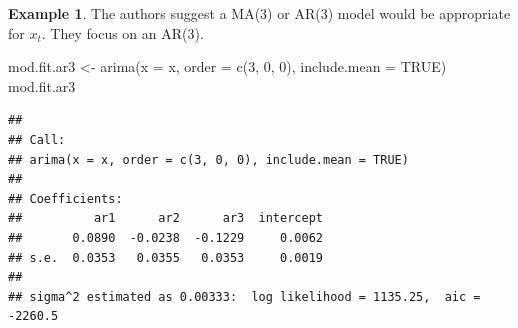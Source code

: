 \documentclass[
]{book}
\newenvironment{Shaded}{\begin{snugshade}}{\end{snugshade}}
\newcommand{\AttributeTok}[1]{\textcolor[rgb]{0.77,0.63,0.00}{#1}}
\newcommand{\ConstantTok}[1]{\textcolor[rgb]{0.00,0.00,0.00}{#1}}
\newcommand{\DecValTok}[1]{\textcolor[rgb]{0.00,0.00,0.81}{#1}}
\newcommand{\FunctionTok}[1]{\textcolor[rgb]{0.00,0.00,0.00}{#1}}
\newcommand{\NormalTok}[1]{#1}
\newcommand{\OtherTok}[1]{\textcolor[rgb]{0.56,0.35,0.01}{#1}}
\newcommand{\SpecialCharTok}[1]{\textcolor[rgb]{0.00,0.00,0.00}{#1}}
\theoremstyle{definition}
\theoremstyle{definition}
\newtheorem{example}{Example}[chapter]
\theoremstyle{definition}
\theoremstyle{definition}
\theoremstyle{remark}
\begin{document}
\begin{example}
The authors suggest a MA(3) or AR(3) model would be appropriate for \(x_t\). They focus on an AR(3).

\begin{Shaded}
\begin{Highlighting}[]
\NormalTok{mod.fit.ar3 }\OtherTok{\textless{}{-}} \FunctionTok{arima}\NormalTok{(}\AttributeTok{x =}\NormalTok{ x, }\AttributeTok{order =} \FunctionTok{c}\NormalTok{(}\DecValTok{3}\NormalTok{, }\DecValTok{0}\NormalTok{, }\DecValTok{0}\NormalTok{), }
                       \AttributeTok{include.mean =} \ConstantTok{TRUE}\NormalTok{)}
\NormalTok{mod.fit.ar3}
\end{Highlighting}
\end{Shaded}

\begin{verbatim}
## 
## Call:
## arima(x = x, order = c(3, 0, 0), include.mean = TRUE)
## 
## Coefficients:
##          ar1      ar2      ar3  intercept
##       0.0890  -0.0238  -0.1229     0.0062
## s.e.  0.0353   0.0355   0.0353     0.0019
## 
## sigma^2 estimated as 0.00333:  log likelihood = 1135.25,  aic = -2260.5
\end{verbatim}

\begin{Shaded}
\end{Shaded}


\end{example}
\end{document}
